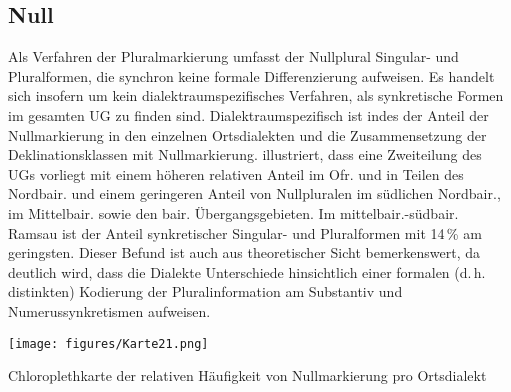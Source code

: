 \subsection{Null}
\label{sec:7.1.3}
Als Verfahren der Pluralmarkierung umfasst der Nullplural Singular- und Pluralformen, die synchron keine formale Differenzierung aufweisen. Es handelt sich insofern um kein dialektraumspezifisches Verfahren, als synkretische Formen im gesamten UG zu finden sind. Dialektraumspezifisch ist indes der Anteil der Nullmarkierung in den einzelnen Ortsdialekten und die Zusammensetzung der Deklinationsklassen mit Nullmarkierung.  illustriert, dass eine Zweiteilung des UGs vorliegt mit einem höheren relativen Anteil im Ofr. und in Teilen des Nordbair. und einem geringeren Anteil von Nullpluralen im südlichen Nordbair., im Mittelbair. sowie den bair. Übergangsgebieten. Im mittelbair.-südbair. Ramsau ist der Anteil synkretischer Singular- und Pluralformen mit 14\,\% am geringsten. Dieser Befund ist auch aus theoretischer Sicht bemerkenswert, da deutlich wird, dass die Dialekte Unterschiede hinsichtlich einer formalen (d.\,h. distinkten) Kodierung der Pluralinformation am Substantiv und Numerussynkretismen aufweisen.


\begin{map}
\texttt{[image: figures/Karte21.png]}
\caption{Chloroplethkarte der relativen Häufigkeit von Nullmarkierung pro Ortsdialekt}
\label{map:21}
\end{map}

